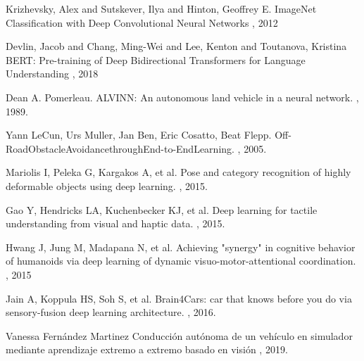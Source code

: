 
  


\begin{thebibliography}{1}


Krizhevsky, Alex and Sutskever, Ilya and Hinton, Geoffrey E.
\newblock ImageNet Classification with Deep Convolutional Neural Networks
, 2012

Devlin, Jacob and Chang, Ming-Wei and Lee, Kenton and Toutanova, Kristina
\newblock BERT: Pre-training of Deep Bidirectional Transformers for Language Understanding
, 2018

Dean A. Pomerleau.
\newblock ALVINN: An autonomous land vehicle in a neural network.
, 1989.

Yann LeCun, Urs Muller, Jan Ben, Eric Cosatto, Beat Flepp.
\newblock Off-RoadObstacleAvoidancethroughEnd-to-EndLearning.
, 2005.

Mariolis I, Peleka G, Kargakos A, et al. 
\newblock Pose and category recognition of highly deformable objects using deep learning.
, 2015.

Gao Y, Hendricks LA, Kuchenbecker KJ, et al.
\newblock Deep learning for tactile understanding from visual and haptic data.
, 2015.
 
Hwang J, Jung M, Madapana N, et al. 
\newblock Achieving "synergy" in cognitive behavior of humanoids via deep learning of dynamic visuo-motor-attentional coordination. 
, 2015
 
Jain A, Koppula HS, Soh S, et al. 
\newblock Brain4Cars: car that knows before you do via sensory-fusion deep learning architecture. 
, 2016.

Vanessa Fernández Martinez
\newblock Conducción autónoma de un vehículo en simulador mediante aprendizaje extremo a extremo basado en visión
, 2019.


\end{thebibliography}
